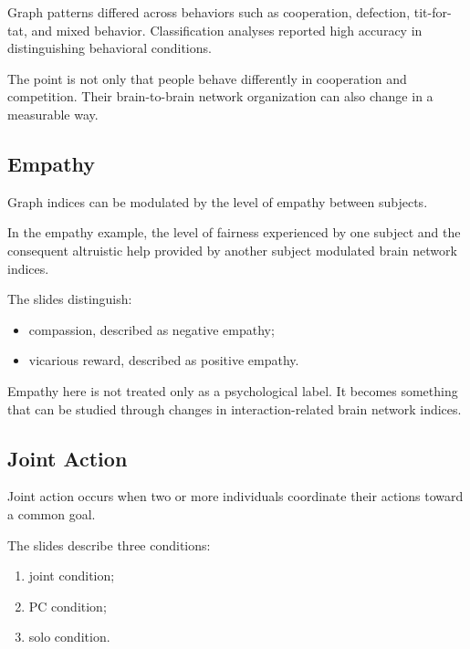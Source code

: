 Graph patterns differed across behaviors such as cooperation, defection, tit-for-tat, and mixed behavior. Classification analyses reported high accuracy in distinguishing behavioral conditions.

\begin{authornote}
The point is not only that people behave differently in cooperation and competition. Their brain-to-brain network organization can also change in a measurable way.
\end{authornote}

\subsection{Empathy}

Graph indices can be modulated by the level of empathy between subjects.

In the empathy example, the level of fairness experienced by one subject and the consequent altruistic help provided by another subject modulated brain network indices.

The slides distinguish:

\begin{itemize}[noitemsep]
    \item compassion, described as negative empathy;
    \item vicarious reward, described as positive empathy.
\end{itemize}

\begin{authornote}
Empathy here is not treated only as a psychological label. It becomes something that can be studied through changes in interaction-related brain network indices.
\end{authornote}

\subsection{Joint Action}

Joint action occurs when two or more individuals coordinate their actions toward a common goal.

The slides describe three conditions:

\begin{enumerate}[noitemsep]
    \item joint condition;
    \item PC condition;
    \item solo condition.
\end{enumerate}

